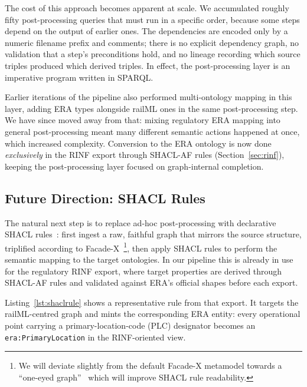 \documentclass{ceurart}
\begin{document}
The cost of this approach becomes apparent at scale. We accumulated roughly
fifty post-processing queries that must run in a specific order, because some
steps depend on the output of earlier ones. The dependencies are encoded only by
a numeric filename prefix and comments; there is no explicit dependency graph, no
validation that a step's preconditions hold, and no lineage recording which
source triples produced which derived triples. In effect, the post-processing
layer is an imperative program written in SPARQL.

Earlier iterations of the pipeline also performed multi-ontology mapping in this
layer, adding ERA types alongside railML ones in the same post-processing step.
We have since moved away from that: mixing regulatory ERA mapping into general
post-processing meant many different semantic actions happened at once, which
increased complexity. Conversion to the ERA ontology is now done
\emph{exclusively} in the RINF export through SHACL-AF rules
(Section~\ref{sec:rinf}), keeping the post-processing layer focused on
graph-internal completion.

\subsection{Future Direction: SHACL Rules}

The natural next step is to replace ad-hoc post-processing with declarative SHACL
rules~\cite{shacl,shaclaf}: first ingest a raw, faithful graph that mirrors the
source structure, triplified according to Facade-X~\cite{facadex}\footnote{We will
deviate slightly from the default Facade-X metamodel towards a 
``one-eyed graph''~\cite{oneeyedgraph} which will improve SHACL rule readability.},
then apply SHACL rules to perform the semantic mapping to the target ontologies.
In our pipeline this is already in use for the regulatory RINF export, where
target properties are derived through SHACL-AF rules and validated against ERA's
official shapes before each export.

Listing~\ref{lst:shaclrule} shows a representative rule from that export. It
targets the railML-centred graph and mints the corresponding ERA entity: every
operational point carrying a primary-location-code (PLC) designator becomes an
\allowbreak\mbox{\texttt{era:PrimaryLocation}} in the RINF-oriented view.
\end{document}
